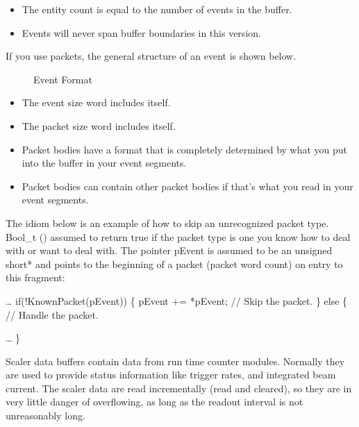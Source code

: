    \begin{itemize}
      \item The entity count is equal to the number of events in
         the buffer.
      \item Events will never span buffer boundaries in this version.
   \end{itemize}
   
   If you use packets, the general structure of an event is 
   shown below.
     \begin{figure}[htb]
	 \caption{Event Format}\label{f:eventformat}
      \end{figure}
 
   \begin{note}
      \begin{itemize}
         \item The event size word includes itself.
         \item The packet size word includes itself.
         \item Packet bodies have a format that is 
            completely determined by what you put into the
            buffer in your event segments.
         \item Packet bodies can contain other packet bodies
            if that's what you read in your event segments.
      \end{itemize}
   \end{note}
   
   The idiom below is an example of how to skip an 
   unrecognized packet type. Bool\_t () 
   assumed to return true if the packet type is one you
   know how to deal with or want to deal with. The pointer pEvent
   is assumed to be an unsigned short* and points to the
   beginning of a packet (packet word count) on entry to
   this fragment:
   \begin{example}
      \ldots
      if(!KnownPacket(pEvent)) \{
         pEvent += *pEvent;    // Skip the packet.
      \}
      else \{
         // Handle the packet.
         
         \ldots
      \}
   \end{example}
   
   Scaler data buffers contain data from run time counter
   modules.  Normally they are used to provide status 
   information like trigger rates, and integrated beam
   current.  The scaler data are read incrementally (read
   and cleared), so they are in very little danger of 
   overflowing, as long as the readout interval is not
   unreasonably long.
   
